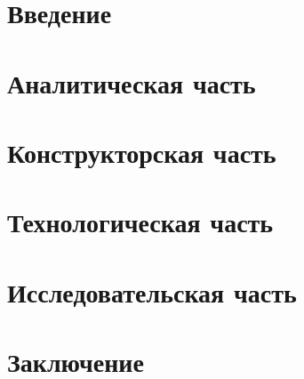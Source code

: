 \documentclass[12pt]{report}
\begin{document}
	\renewcommand\bibname{Список литературы}
	
	
	
	\tableofcontents
	\newpage
	
	\chapter*{Введение}
	
	\newpage
	
	\chapter{Аналитическая часть}
	
	\newpage
	
	\chapter{Конструкторская часть}
	
	\newpage
	
	\chapter{Технологическая часть}
	
	\newpage
	
	\chapter{Исследовательская часть}
	
	\newpage
	
	\chapter*{Заключение}
	
	\newpage
	
\end{document}
